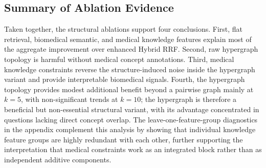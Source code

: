 \subsection{Summary of Ablation Evidence}

Taken together, the structural ablations support four conclusions. First, flat retrieval, biomedical semantic, and medical knowledge features explain most of the aggregate improvement over enhanced Hybrid RRF. Second, raw hypergraph topology is harmful without medical concept annotations. Third, medical knowledge constraints reverse the structure-induced noise inside the hypergraph variant and provide interpretable biomedical signals. Fourth, the hypergraph topology provides modest additional benefit beyond a pairwise graph mainly at $k{=}5$, with non-significant trends at $k{=}10$; the hypergraph is therefore a beneficial but non-essential structural variant, with its advantage concentrated in questions lacking direct concept overlap. The leave-one-feature-group diagnostics in the appendix complement this analysis by showing that individual knowledge feature groups are highly redundant with each other, further supporting the interpretation that medical constraints work as an integrated block rather than as independent additive components.
